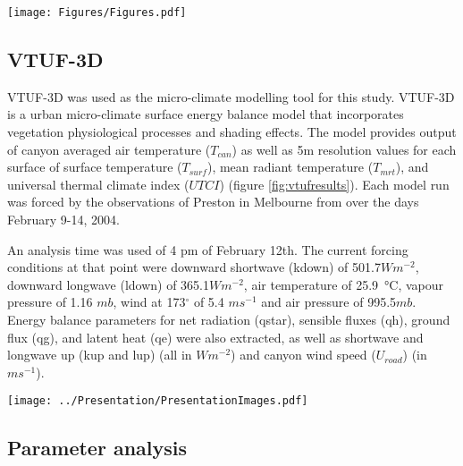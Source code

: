 \documentclass[final,3p,times,authoryear]{elsarticle}
\begin{document}
\begin{figure*}
\centering
\texttt{[image: Figures/Figures.pdf]}
\caption{\bf Melbourne, creation of VTUF-3D scenarios for 9814 variations of parameters.}
 \label{fig:scenarios}
\end{figure*} 






\subsection{VTUF-3D}\label{sec:methodsvtuf}
VTUF-3D \citep{Nice2018a} was used as the micro-climate modelling tool for this study. VTUF-3D is a urban micro-climate surface energy balance model that incorporates vegetation physiological processes and shading effects. The model provides output of canyon averaged air temperature ($T_{can}$) as well as 5m resolution values for each surface of surface temperature ($T_{surf}$), mean radiant temperature ($T_{mrt}$), and universal thermal climate index ($UTCI$) (figure \ref{fig:vtufresults}). Each model run was forced by the observations of Preston in Melbourne from \cite{Coutts2007} over the days February 9-14, 2004. 

An analysis time was used of  4 pm of February 12th. The current forcing conditions at that point were downward shortwave (\gls{kdown}) of 501.7$Wm^{-2}$, downward longwave (\gls{ldown}) of 365.1$Wm^{-2}$, air temperature of 25.9\SI{}{\degreeCelsius}, vapour pressure of 1.16 $mb$, wind at 173$^{\circ}$ of 5.4 $ms^{-1}$ and air pressure of 995.5$mb$. Energy balance parameters for net radiation (\gls{qstar}), sensible fluxes (\gls{qh}), ground flux (\gls{qg}), and latent heat (\gls{qe}) were also extracted, as well as shortwave and longwave up (\gls{kup} and \gls{lup}) (all in $Wm^{-2}$) and canyon wind speed ($U_{road}$) (in $ms^{-1}$).

\begin{figure*}
\centering
\texttt{[image: ../Presentation/PresentationImages.pdf]}
\caption{\bf Melbourne, VTUF-3D results.}
 \label{fig:vtufresults}
\end{figure*} 

\subsection{Parameter analysis}\label{sec:methodsparam}
\end{document}
